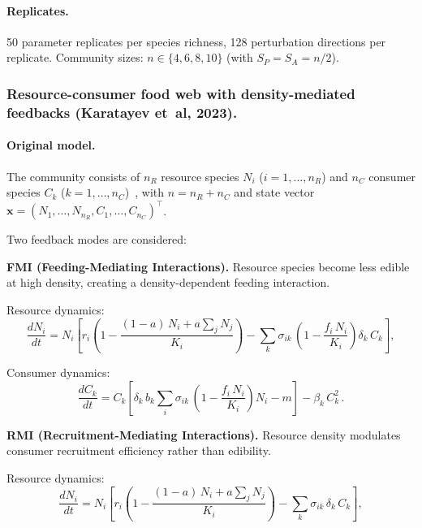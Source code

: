 \documentclass[pdflatex,sn-mathphys-num]{sn-jnl}%
\begin{document}
\paragraph{Replicates.} 50 parameter replicates per species richness, 128 perturbation directions per replicate. Community sizes: $n \in \{4, 6, 8, 10\}$ (with $S_P = S_A = n/2$).

\subsubsection{Resource-consumer food web with density-mediated feedbacks (Karatayev et~al, 2023). }
\label{sec:si_karatayev}

\paragraph{Original model.} The community consists of $n_R$ resource species $N_i$ ($i=1,\dots,n_R$) and $n_C$ consumer species $C_k$ ($k=1,\dots,n_C$)~\cite{karatayev_potential_2023}, with $n = n_R + n_C$ and state vector $\mathbf{x} = (N_1,\dots,N_{n_R},C_1,\dots,C_{n_C})^\top$.

Two feedback modes are considered:

\noindent\textbf{FMI (Feeding-Mediating Interactions).} Resource species become less edible at high density, creating a density-dependent feeding interaction.

Resource dynamics:
\begin{equation}\label{eq:karat_res_fmi}
 \frac{dN_i}{dt}
 = N_i\!\left[
  r_i\!\left(1 - \frac{(1-a)\,N_i + a\!\sum_{j} N_j}{K_i}\right)
 - \sum_{k} \sigma_{ik}\,
  \!\left(1 - \frac{f_i\,N_i}{K_i}\right)\!\delta_k\, C_k
 \right],
\end{equation}

Consumer dynamics:
\begin{equation}\label{eq:karat_con_fmi}
 \frac{dC_k}{dt}
 = C_k\!\left[
  \delta_k\, b_k\!\sum_{i} \sigma_{ik}\,
  \!\left(1 - \frac{f_i\,N_i}{K_i}\right) N_i
 - m
 \right]
 - \beta_k\, C_k^2\,.
\end{equation}

\noindent\textbf{RMI (Recruitment-Mediating Interactions).} Resource density modulates consumer recruitment efficiency rather than edibility.

Resource dynamics:
\begin{equation}\label{eq:karat_res_rmi}
 \frac{dN_i}{dt}
 = N_i\!\left[
  r_i\!\left(1 - \frac{(1-a)\,N_i + a\!\sum_{j} N_j}{K_i}\right)
 - \sum_{k} \sigma_{ik}\,\delta_k\, C_k
 \right],
\end{equation}
\end{document}
